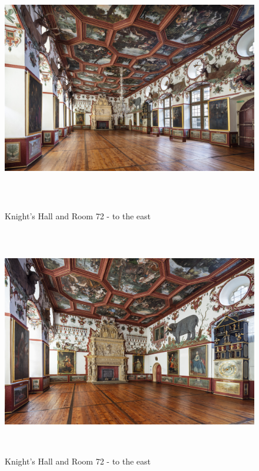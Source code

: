 \documentclass[
  a4paper,
]{book}
\begin{document}
\begin{figure}
\includegraphics[height=10cm]{images/fmd10005859a.jpg}

\caption{Knight's Hall and Room 72 - to the east}
\label{fig:{images/fmd10005859a.jpg}}

\clearpage

\centering

\includegraphics[height=10cm]{images/fmd10005860a.jpg}

\caption{Knight's Hall and Room 72 - to the east}
\label{fig:{images/fmd10005860a.jpg}}

\clearpage

\end{figure}%


\backmatter
\end{document}
